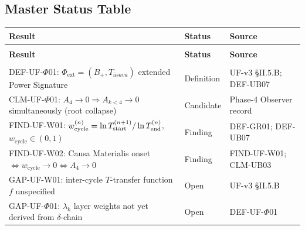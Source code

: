 \documentclass[12pt, a4paper]{article}
\providecommand{\Phiext}{\Phi_{\mathrm{ext}}}
\providecommand{\Bplus}{B_{+}}
\providecommand{\Tasava}{T_{\bar{\mathrm{a}}sava}}
\providecommand{\Tasava}{\mathcal{T}_{\!\mathrm{\bar{a}sava}}}
\begin{document}
\subsection{Master Status Table}


{\small
\setlength{\LTpre}{4pt}
\setlength{\LTpost}{4pt}
\renewcommand{\arraystretch}{1.30}
\begin{longtable}{>{\raggedright\arraybackslash}p{7.2cm}
                  >{\centering\arraybackslash}p{2.2cm}
                  >{\raggedright\arraybackslash}p{3.3cm}}
\toprule
\textbf{Result} & \textbf{Status} & \textbf{Source} \\
\midrule
\endfirsthead
\multicolumn{3}{l}{\small\textit{(continued)}} \\[4pt]
\toprule
\textbf{Result} & \textbf{Status} & \textbf{Source} \\
\midrule
\endhead
\midrule
\multicolumn{3}{r}{\small\textit{(continues)}} \\
\endfoot
\bottomrule
\endlastfoot

DEF-UF-$\Phi$01: $\Phiext = (\Bplus, \Tasava)$
  extended Power Signature &
  Definition &
  UF-v3 \S II.5.B; DEF-UB07 \\

CLM-UF-$\Phi$01: $A_4 \to 0 \Rightarrow A_{k<4} \to 0$
  simultaneously (root collapse) &
  Candidate &
  Phase-4 Observer record \\

FIND-UF-W01: $w_{\mathrm{cycle}}^{(n)} = \ln T^{(n+1)}_{\rm start}
  / \ln T^{(n)}_{\rm end}$, $w_{\mathrm{cycle}} \in (0,1)$ &
  Finding &
  DEF-GR01; DEF-UB07 \\

FIND-UF-W02: Causa Materialis onset
  $\Leftrightarrow w_{\mathrm{cycle}} \to 0
  \Leftrightarrow A_4 \to 0$ &
  Finding &
  FIND-UF-W01; CLM-UB03 \\

GAP-UF-W01: inter-cycle $T$-transfer
  function $f$ unspecified &
  Open &
  UF-v3 \S II.5.B \\

GAP-UF-$\Phi$01: $\lambda_k$ layer weights
  not yet derived from $\delta$-chain &
  Open &
  DEF-UF-$\Phi$01 \\

\end{longtable}
}
\vspace{-\parskip}
\end{document}
